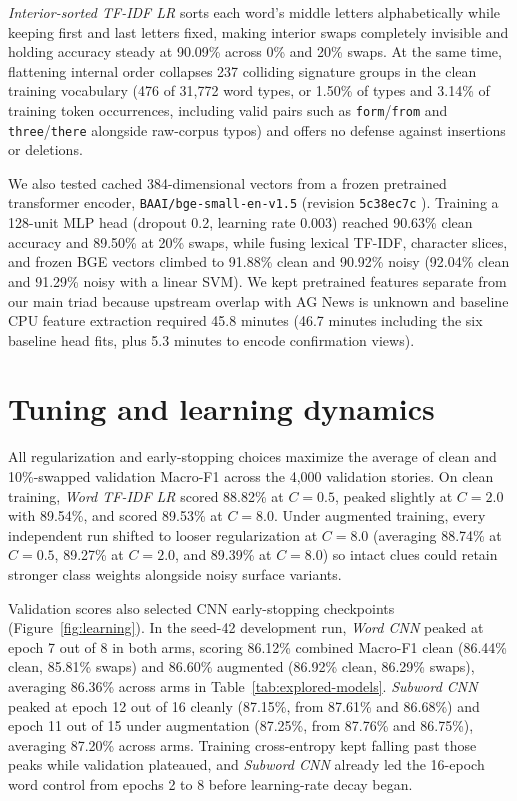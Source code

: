 \textit{Interior-sorted TF-IDF LR} sorts each word's middle letters alphabetically while keeping first and last letters fixed, making interior swaps completely invisible and holding accuracy steady at 90.09\% across 0\% and 20\% swaps. At the same time, flattening internal order collapses 237 colliding signature groups in the clean training vocabulary (476 of 31,772 word types, or 1.50\% of types and 3.14\% of training token occurrences, including valid pairs such as \texttt{form}/\texttt{from} and \texttt{three}/\texttt{there} alongside raw-corpus typos) and offers no defense against insertions or deletions.

We also tested cached 384-dimensional vectors from a frozen pretrained transformer encoder, \texttt{BAAI/bge-small-en-v1.5} \citep{bgesmall} (revision \texttt{5c38ec7c} \citep{bgecheckpoint}). Training a 128-unit MLP head (dropout 0.2, learning rate 0.003) reached 90.63\% clean accuracy and 89.50\% at 20\% swaps, while fusing lexical TF-IDF, character slices, and frozen BGE vectors climbed to 91.88\% clean and 90.92\% noisy (92.04\% clean and 91.29\% noisy with a linear SVM). We kept pretrained features separate from our main triad because upstream overlap with AG News is unknown and baseline CPU feature extraction required 45.8 minutes (46.7 minutes including the six baseline head fits, plus 5.3 minutes to encode confirmation views).

\section{Tuning and learning dynamics}
All regularization and early-stopping choices maximize the average of clean and 10\%-swapped validation Macro-F1 across the 4,000 validation stories. On clean training, \textit{Word TF-IDF LR} scored 88.82\% at $C = 0.5$, peaked slightly at $C = 2.0$ with 89.54\%, and scored 89.53\% at $C = 8.0$. Under augmented training, every independent run shifted to looser regularization at $C = 8.0$ (averaging 88.74\% at $C = 0.5$, 89.27\% at $C = 2.0$, and 89.39\% at $C = 8.0$) so intact clues could retain stronger class weights alongside noisy surface variants.

Validation scores also selected CNN early-stopping checkpoints (Figure~\ref{fig:learning}). In the seed-42 development run, \textit{Word CNN} peaked at epoch 7 out of 8 in both arms, scoring 86.12\% combined Macro-F1 clean (86.44\% clean, 85.81\% swaps) and 86.60\% augmented (86.92\% clean, 86.29\% swaps), averaging 86.36\% across arms in Table~\ref{tab:explored-models}. \textit{Subword CNN} peaked at epoch 12 out of 16 cleanly (87.15\%, from 87.61\% and 86.68\%) and epoch 11 out of 15 under augmentation (87.25\%, from 87.76\% and 86.75\%), averaging 87.20\% across arms. Training cross-entropy kept falling past those peaks while validation plateaued, and \textit{Subword CNN} already led the 16-epoch word control from epochs 2 to 8 before learning-rate decay began.


